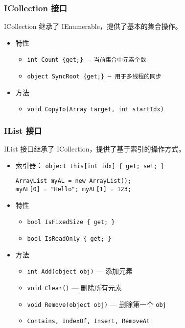 \begin{frame}
\frametitle{ICollection 接口}
ICollection 继承了 IEnumerable，提供了基本的集合操作。
\begin{itemize}
\setlength{\itemsep}{8pt plus 1pt}
\item 特性
\begin{itemize}
\setlength{\itemsep}{6pt plus 1pt}
\item \texttt{int Count \{get;\} --- 当前集合中元素个数}
\item \texttt{object SyncRoot \{get;\} --- 用于多线程的同步}
\end{itemize}
\item 方法
\begin{itemize}
\item \texttt{void CopyTo(Array target, int startIdx)}
\end{itemize}
\end{itemize}
\end{frame}

\begin{frame}[fragile]
\frametitle{IList 接口}
IList 接口继承了 ICollection，提供了基于索引的操作方式。
\begin{itemize}
\item 索引器： \texttt{object this[int idx] \{ get; set; \}}
\begin{lstlisting}
ArrayList myAL = new ArrayList();
myAL[0] = "Hello"; myAL[1] = 123;
\end{lstlisting}
\item 特性
\begin{itemize}
\item \texttt{bool IsFixedSize \{ get; \}}
\item \texttt{bool IsReadOnly \{ get; \}}
\end{itemize}
\item 方法
\begin{itemize}
\item \texttt{int Add(object obj)} --- 添加元素
\item \texttt{void Clear()} --- 删除所有元素
\item \texttt{void Remove(object obj)} --- 删除第一个 \texttt{obj}
\item \texttt{Contains, IndexOf, Insert, RemoveAt}
\end{itemize}
\end{itemize}
\end{frame}

